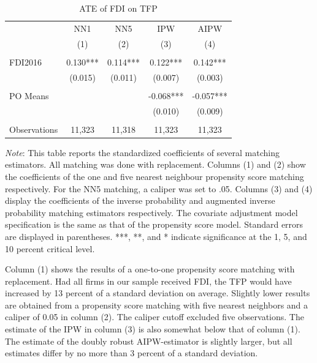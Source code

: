 \documentclass[a4paper,11pt]{scrartcl}
\begin{document}
\begin{table}[h!]
 	\centering
   	\caption{ATE of FDI on TFP}
   	\label{tab:mainresults}
\begin{threeparttable}
	
 \begin{tabular}{l*{4}{c}}
	\hline
	\hline
 			& NN1 & NN5 & IPW & AIPW \\
 			& (1) & (2) & (3)  & (4) \\ \hline
 			&  &  &  &    \\
FDI2016 	& 0.130*** & 0.114*** & 0.122***  & 0.142***   \\
 			& (0.015) & (0.011) & (0.007) &   (0.003)  \\
 	&  &  &  &    \\
PO Means 	& & & -0.068*** &  -0.057*** \\
			&  &  & (0.010)  &  (0.009) \\
			&  &  &  &    \\
 Observations & 11,323 & 11,318 & 11,323 & 11,323 \\ 
 	\hline
 	\hline 
\end{tabular}

\begin{tablenotes}[flushleft]
      \footnotesize
\item \textit{Note}: This table reports the standardized coefficients of several matching estimators. All matching was done with replacement. Columns (1) and (2) show the coefficients of the one and five nearest neighbour propensity score matching respectively. For the NN5 matching, a caliper was set to .05. Columns (3) and (4) display the coefficients of the inverse probability and augmented inverse probability matching estimators respectively. The covariate adjustment model specification is the same as that of the propensity score model. Standard errors are displayed in parentheses. ***, **, and * indicate significance at the 1, 5, and 10 percent critical level.

\end{tablenotes}

\end{threeparttable}
\end{table}

Column (1) shows the results of a one-to-one propensity score matching with replacement. Had all firms in our sample received FDI, the TFP would have increased by 13 percent of a standard deviation on average. Slightly lower results are obtained from a propensity score matching with five nearest neighbors and a caliper of 0.05 in column (2). The caliper cutoff excluded five observations. The estimate of the IPW in column (3) is also somewhat below that of column (1). The estimate of the doubly robust AIPW-estimator is slightly larger, but all estimates differ by no more than 3 percent of a standard deviation.
\end{document}

